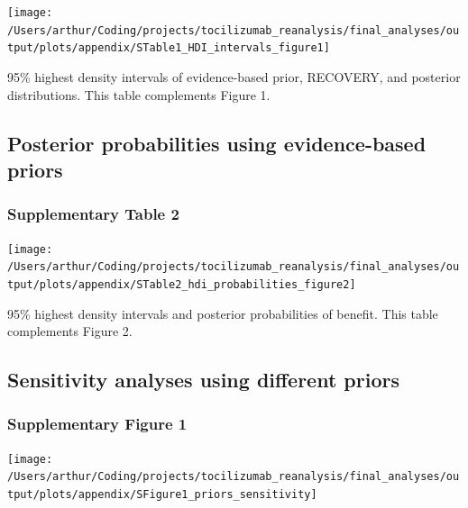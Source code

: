 \documentclass[
]{article}
\begin{document}
\begin{center}\texttt{[image: /Users/arthur/Coding/projects/tocilizumab\_reanalysis/final\_analyses/output/plots/appendix/STable1\_HDI\_intervals\_figure1]} \end{center}

95\% highest density intervals of evidence-based prior, RECOVERY, and
posterior distributions. This table complements Figure 1.

\newpage

\hypertarget{posterior-probabilities-using-evidence-based-priors}{%
\subsection{Posterior probabilities using evidence-based
priors}\label{posterior-probabilities-using-evidence-based-priors}}

\hypertarget{supplementary-table-2}{%
\subsubsection{Supplementary Table 2}\label{supplementary-table-2}}

\begin{center}\texttt{[image: /Users/arthur/Coding/projects/tocilizumab\_reanalysis/final\_analyses/output/plots/appendix/STable2\_hdi\_probabilities\_figure2]} \end{center}

95\% highest density intervals and posterior probabilities of benefit.
This table complements Figure 2.

\newpage

\hypertarget{sensitivity-analyses-using-different-priors}{%
\subsection{Sensitivity analyses using different
priors}\label{sensitivity-analyses-using-different-priors}}

\hypertarget{supplementary-figure-1}{%
\subsubsection{Supplementary Figure 1}\label{supplementary-figure-1}}

\begin{center}\texttt{[image: /Users/arthur/Coding/projects/tocilizumab\_reanalysis/final\_analyses/output/plots/appendix/SFigure1\_priors\_sensitivity]} \end{center}
\end{document}

